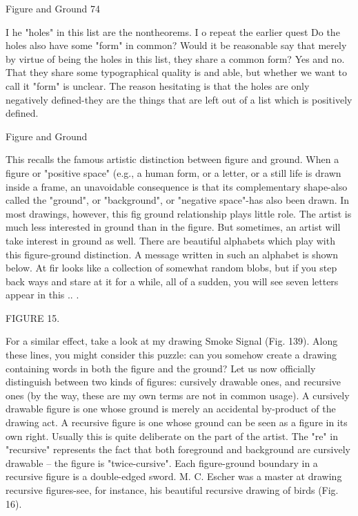 Figure and Ground                                                                        74

I he "holes" in this list are the nontheorems. I o repeat the earlier quest Do the holes also
have some "form" in common? Would it be reasonable say that merely by virtue of being
the holes in this list, they share a common form? Yes and no. That they share some
typographical quality is and able, but whether we want to call it "form" is unclear. The
reason hesitating is that the holes are only negatively defined-they are the things that are
left out of a list which is positively defined.

       Figure and Ground

This recalls the famous artistic distinction between figure and ground. When a figure or
"positive space" (e.g., a human form, or a letter, or a still life is drawn inside a frame, an
unavoidable consequence is that its complementary shape-also called the "ground", or
"background", or "negative space"-has also been drawn. In most drawings, however, this
fig ground relationship plays little role. The artist is much less interested in ground than
in the figure. But sometimes, an artist will take interest in ground as well.
         There are beautiful alphabets which play with this figure-ground distinction. A
message written in such an alphabet is shown below. At fir looks like a collection of
somewhat random blobs, but if you step back ways and stare at it for a while, all of a
sudden, you will see seven letters appear in this ..
         .




                                            FIGURE 15.


For a similar effect, take a look at my drawing Smoke Signal (Fig. 139). Along these
lines, you might consider this puzzle: can you somehow create a drawing containing
words in both the figure and the ground?
        Let us now officially distinguish between two kinds of figures: cursively
drawable ones, and recursive ones (by the way, these are my own terms are not in
common usage). A cursively drawable figure is one whose ground is merely an
accidental by-product of the drawing act. A recursive figure is one whose ground can be
seen as a figure in its own right. Usually this is quite deliberate on the part of the artist.
The "re" in "recursive" represents the fact that both foreground and background are
cursively drawable – the figure is "twice-cursive". Each figure-ground boundary in a
recursive figure is a double-edged sword. M. C. Escher was a master at drawing recursive
figures-see, for instance, his beautiful recursive drawing of birds (Fig. 16).




